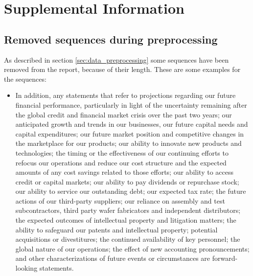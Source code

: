 \chapter{Supplemental Information}\label{app:supplemental-information}

\section{Removed sequences during preprocessing}
\label{app:removed_sequences}

As described in section \ref{sec:data_preprocessing} some sequences have been removed from the report, because of their length. These are some examples for the sequences:
\begin{itemize}
    \item In addition, any statements that refer to projections regarding our future financial performance, particularly in light of the uncertainty remaining after the global credit and financial market crisis over the past two years; our anticipated growth and trends in our businesses, our future capital needs and capital expenditures; our future market position and competitive changes in the marketplace for our products; our ability to innovate new products and technologies; the timing or the effectiveness of our continuing efforts to refocus our operations and reduce our cost structure and the expected amounts of any cost savings related to those efforts; our ability to access credit or capital markets; our ability to pay dividends or repurchase stock; our ability to service our outstanding debt; our expected tax rate; the future actions of our third-party suppliers; our reliance on assembly and test subcontractors, third party wafer fabricators and independent distributors; the expected outcomes of intellectual property and litigation matters; the ability to safeguard our patents and intellectual property; potential acquisitions or divestitures; the continued availability of key personnel; the global nature of our operations; the effect of new accounting pronouncements; and other characterizations of future events or circumstances are forward-looking statements.

\end{itemize}
